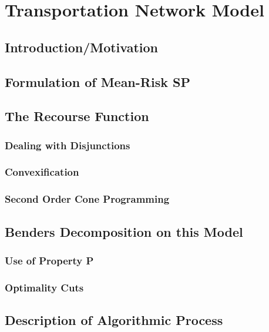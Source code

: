 \chapter{Transportation Network Model}

\section{Introduction/Motivation}

\section{Formulation of Mean-Risk SP}

\section{The Recourse Function}
\subsection{Dealing with Disjunctions}
\subsection{Convexification} 
\subsection{Second Order Cone Programming}

\section{Benders Decomposition on this Model}
\subsection{Use of Property P}
\subsection{Optimality Cuts}

\section{Description of Algorithmic Process}